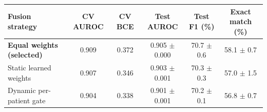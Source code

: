 \begin{tabular}{@{}lccccc@{}}
\toprule
Fusion strategy & CV AUROC & CV BCE & Test AUROC & Test F1 (\%) & Exact match (\%) \\
\midrule
\textbf{Equal weights (selected)} & 0.909 & 0.372 & 0.905 $\pm$ 0.000 & 70.7 $\pm$ 0.6 & 58.1 $\pm$ 0.7 \\
Static learned weights & 0.907 & 0.346 & 0.903 $\pm$ 0.001 & 70.3 $\pm$ 0.3 & 57.0 $\pm$ 1.5 \\
Dynamic per-patient gate & 0.904 & 0.338 & 0.901 $\pm$ 0.001 & 70.2 $\pm$ 0.1 & 56.8 $\pm$ 0.7 \\
\bottomrule
\end{tabular}
